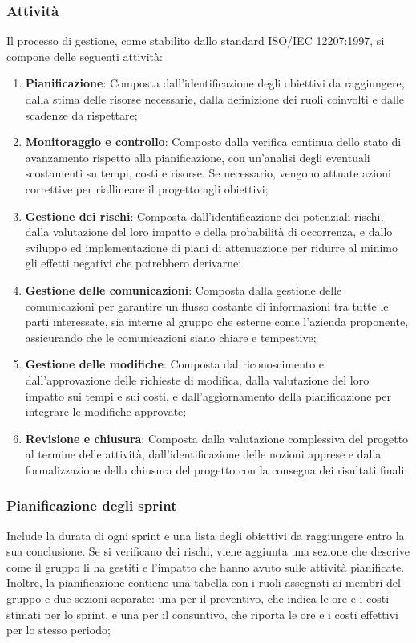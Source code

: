 \documentclass[10pt]{article}
\begin{document}
\begin{justify}
    \subsubsection{Attività}
    Il processo di gestione, come stabilito dallo standard ISO/IEC 12207:1997, si compone delle seguenti attività:
    \begin{enumerate}
        \item \textbf{Pianificazione}: Composta dall'identificazione degli obiettivi da raggiungere, dalla stima delle risorse necessarie, dalla definizione dei ruoli coinvolti e dalle scadenze da rispettare;
        \item \textbf{Monitoraggio e controllo}: Composto dalla verifica continua dello stato di avanzamento rispetto alla pianificazione, con un'analisi degli eventuali scostamenti su tempi, costi e risorse. Se necessario, vengono attuate azioni correttive per riallineare il progetto agli obiettivi;
        \item \textbf{Gestione dei rischi}: Composta dall'identificazione dei potenziali rischi, dalla valutazione del loro impatto e della probabilità di occorrenza, e dallo sviluppo ed implementazione di piani di attenuazione per ridurre al minimo gli effetti negativi che potrebbero derivarne;
        \item \textbf{Gestione delle comunicazioni}: Composta dalla gestione delle comunicazioni per garantire un flusso costante di informazioni tra tutte le parti interessate, sia interne al gruppo che esterne come l'azienda proponente, assicurando che le comunicazioni siano chiare e tempestive;
        \item \textbf{Gestione delle modifiche}: Composta dal riconoscimento e dall'approvazione delle richieste di modifica, dalla valutazione del loro impatto sui tempi e sui costi, e dall'aggiornamento della pianificazione per integrare le modifiche approvate;
        \item \textbf{Revisione e chiusura}: Composta dalla valutazione complessiva del progetto al termine delle attività, dall'identificazione delle nozioni apprese e dalla formalizzazione della chiusura del progetto con la consegna dei risultati finali;
    \end{enumerate}

    \subsubsection{Pianificazione degli sprint}
    Include la durata di ogni sprint e una lista degli obiettivi da raggiungere entro la sua conclusione. Se si verificano dei rischi, viene aggiunta una sezione che descrive come il gruppo li ha gestiti e l’impatto che hanno avuto sulle attività pianificate. Inoltre, la pianificazione contiene una tabella con i ruoli assegnati ai membri del gruppo e due sezioni separate: una per il preventivo, che indica le ore e i costi stimati per lo sprint, e una per il consuntivo, che riporta le ore e i costi effettivi per lo stesso periodo;


\end{justify}
\end{document}
